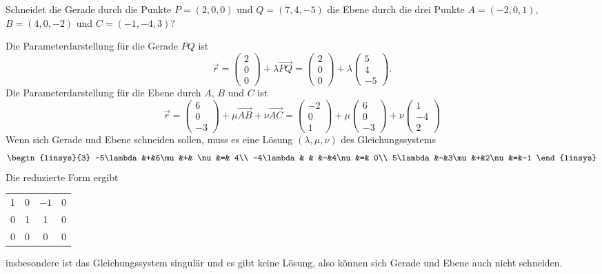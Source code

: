Schneidet die Gerade durch die Punkte $P=(2,0,0)$ und $Q=(7,4,-5)$
die Ebene durch
die drei Punkte $A=(-2,0,1)$, $B=(4,0,-2)$ und $C=(-1,-4,3)$?

\begin{loesung}
Die Parameterdarstellung für die Gerade $PQ$ ist
\[
\vec r=
\begin{pmatrix} 2\\0\\0 \end{pmatrix}
+\lambda \overrightarrow{PQ}
=
\begin{pmatrix} 2\\0\\0 \end{pmatrix}
+\lambda
\begin{pmatrix}  5\\4\\-5\end{pmatrix}.
\]
Die Parameterdarstellung für die Ebene durch $A$, $B$ und $C$ ist
\[
\vec r
=
\begin{pmatrix}6\\0\\-3\end{pmatrix}
+\mu \overrightarrow{AB}
+\nu \overrightarrow{AC}
=
\begin{pmatrix}-2\\0\\1\end{pmatrix}
+\mu \begin{pmatrix}6\\0\\-3\end{pmatrix}
+\nu \begin{pmatrix}1\\-4\\2\end{pmatrix}
\]
Wenn sich Gerade und Ebene schneiden sollen, muss es eine Lösung
$(\lambda,\mu,\nu)$ des Gleichungssystems
\[
\begin{linsys}{3}
-5\lambda&+&6\mu&+& \nu&=& 4\\
-4\lambda& &    &-&4\nu&=& 0\\
5\lambda&-&3\mu&+&2\nu&=&-1
\end{linsys}
\]
Die reduzierte Form ergibt
\begin{center}
\begin{tabular}{|ccc|c|}
\hline
1&0&$-1$&0\\
0&1& 1&0\\
0&0& 0&0\\
\hline
\end{tabular}
\end{center}
insbesondere ist das Gleichungssystem singulär und es gibt keine
Lösung, also können sich Gerade und Ebene auch nicht schneiden.


\end{loesung}
